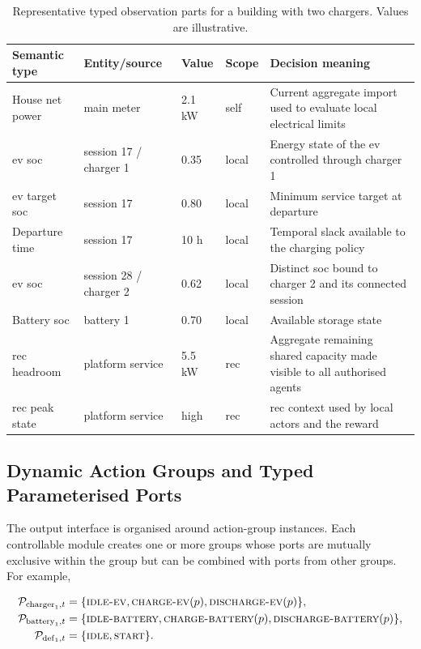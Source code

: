 \begin{table}[htbp]
\centering
\small
\caption{Representative typed observation parts for a building with two chargers. Values are illustrative.}
\label{tab:timarl-running-observations}
\begin{tabularx}{\textwidth}{@{}p{}p{}p{}p{}X@{}}
\toprule
\textbf{Semantic type} & \textbf{Entity/source} & \textbf{Value} & \textbf{Scope} & \textbf{Decision meaning} \\
\midrule
House net power & main meter & 2.1 kW & self & Current aggregate import used to evaluate local electrical limits \\
\gls{ev} \gls{soc} & session 17 / charger 1 & 0.35 & local & Energy state of the \gls{ev} controlled through charger 1 \\
\gls{ev} target \gls{soc} & session 17 & 0.80 & local & Minimum service target at departure \\
Departure time & session 17 & 10 h & local & Temporal slack available to the charging policy \\
\gls{ev} \gls{soc} & session 28 / charger 2 & 0.62 & local & Distinct \gls{soc} bound to charger 2 and its connected session \\
Battery \gls{soc} & battery 1 & 0.70 & local & Available storage state \\
\gls{rec} headroom & platform service & 5.5 kW & \gls{rec} & Aggregate remaining shared capacity made visible to all authorised agents \\
\gls{rec} peak state & platform service & high & \gls{rec} & \gls{rec} context used by local actors and the reward \\
\bottomrule
\end{tabularx}
\end{table}

\subsection{Dynamic Action Groups and Typed Parameterised Ports}
\label{sec:timarl-action-ports}

The output interface is organised around action-group instances. Each controllable module creates one or more groups whose ports are mutually exclusive within the group but can be combined with ports from other groups. For example,

\begin{align}
\mathcal{P}_{\mathrm{charger}_1,t}
&=\{\textsc{idle-ev},\textsc{charge-ev}(p),\textsc{discharge-ev}(p)\},\\
\mathcal{P}_{\mathrm{battery}_1,t}
&=\{\textsc{idle-battery},\textsc{charge-battery}(p),\textsc{discharge-battery}(p)\},\\
\mathcal{P}_{\mathrm{def}_1,t}
&=\{\textsc{idle},\textsc{start}\}.
\end{align}

